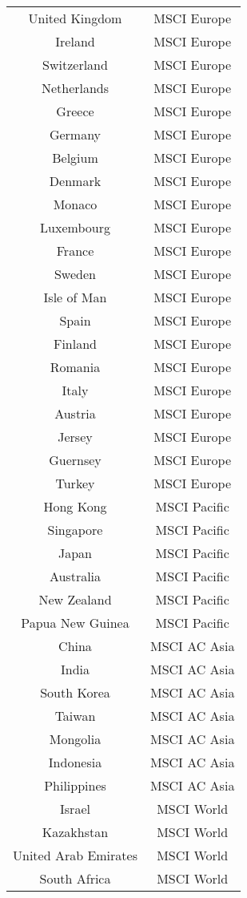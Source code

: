 \documentclass[12pt]{article}
\begin{document}
\begin{longtable}[c]{cc}
       United Kingdom & MSCI Europe  \\
       Ireland & MSCI Europe  \\
       Switzerland & MSCI Europe  \\
       Netherlands & MSCI Europe  \\
       Greece & MSCI Europe  \\
       Germany & MSCI Europe  \\
       Belgium & MSCI Europe  \\
       Denmark & MSCI Europe  \\
       Monaco & MSCI Europe  \\
       Luxembourg & MSCI Europe  \\
       France & MSCI Europe  \\
       Sweden & MSCI Europe  \\
       Isle of Man & MSCI Europe  \\
       Spain & MSCI Europe  \\
       Finland & MSCI Europe  \\
       Romania & MSCI Europe  \\
       Italy & MSCI Europe  \\
       Austria & MSCI Europe  \\
       Jersey & MSCI Europe  \\
       Guernsey & MSCI Europe  \\
       Turkey & MSCI Europe  \\
       
       
       Hong Kong & MSCI Pacific  \\
       Singapore & MSCI Pacific  \\
       Japan & MSCI Pacific  \\
       Australia & MSCI Pacific  \\
       New Zealand & MSCI Pacific  \\
       Papua New Guinea & MSCI Pacific  \\
       
       China & MSCI AC Asia  \\
       India & MSCI AC Asia  \\
       South Korea & MSCI AC Asia  \\
       Taiwan & MSCI AC Asia  \\
       Mongolia & MSCI AC Asia  \\
       Indonesia & MSCI AC Asia  \\
       Philippines & MSCI AC Asia  \\
       
       Israel & MSCI World  \\
       Kazakhstan & MSCI World  \\
       United Arab Emirates & MSCI World  \\
       South Africa & MSCI World \\
    
\end{longtable}
\endgroup
\end{document}
